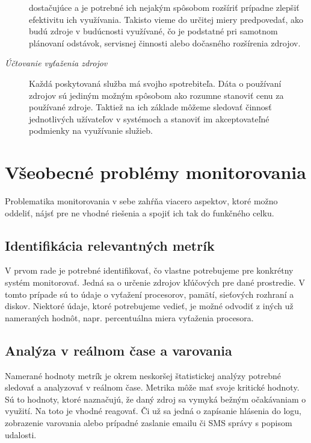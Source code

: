 \documentclass[12pt,twoside,color,cover,table]{fithesis3}
\begin{document}
\begin{description}
dostačujúce a je potrebné ich nejakým spôsobom rozšíriť prípadne zlepšiť efektivitu ich využívania. Takisto vieme do určitej miery predpovedať, ako budú zdroje v budúcnosti využívané, čo je podstatné pri samotnom plánovaní 
odstávok, servisnej činnosti alebo dočasného rozšírenia zdrojov.
\item[\emph{Účtovanie vyťaženia zdrojov}]
Každá poskytovaná služba má svojho spotrebiteľa. Dáta o používaní zdrojov sú jediným možným spôsobom ako rozumne stanoviť cenu za používané zdroje.
Taktiež na ich základe môžeme sledovať činnosť jednotlivých užívateľov v systémoch a stanoviť im akceptovateľné podmienky na využívanie služieb.
\end{description}

\section{Všeobecné problémy monitorovania}
Problematika monitorovania v sebe zahŕňa viacero aspektov, ktoré možno oddeliť, nájsť pre ne vhodné riešenia a spojiť ich tak do funkčného celku. 

\subsection{Identifikácia relevantných metrík}
V prvom rade je potrebné identifikovať, čo vlastne potrebujeme pre konkrétny systém monitorovať. Jedná sa o určenie zdrojov kľúčových pre dané prostredie. V tomto prípade sú to údaje o vyťažení
procesorov, pamätí, sieťových rozhraní a diskov. Niektoré údaje, ktoré potrebujeme vedieť, je možné odvodiť z iných už nameraných hodnôt, napr. percentuálna miera vyťaženia procesora. 

\subsection{Analýza v reálnom čase a varovania}
Namerané hodnoty metrík je okrem neskoršej štatistickej analýzy potrebné sledovať a analyzovať v reálnom čase. Metrika môže mať svoje kritické hodnoty. Sú to hodnoty, ktoré naznačujú, že daný zdroj sa vymyká bežným očakávaniam o využití.
Na toto je vhodné reagovať. Či už sa jedná o zapísanie hlásenia do logu, zobrazenie varovania alebo prípadné zaslanie emailu či SMS správy s popisom udalosti.
\end{document}
